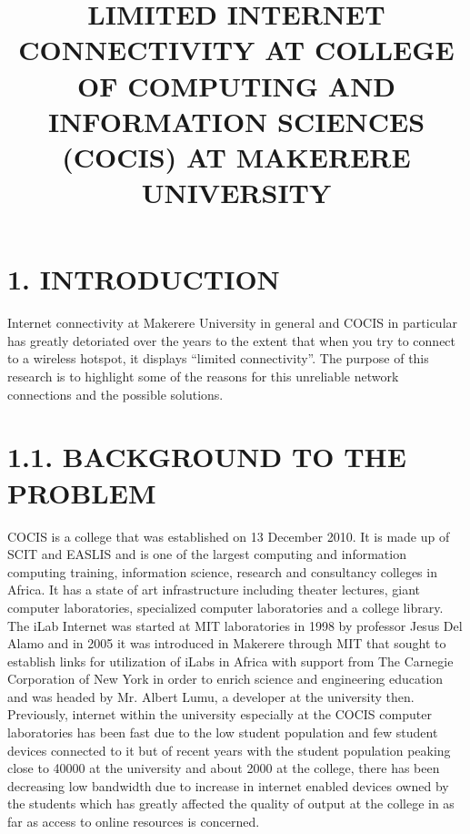\documentclass[11pt]{article}
\begin{document}
\title{LIMITED INTERNET CONNECTIVITY AT COLLEGE OF COMPUTING AND INFORMATION SCIENCES (COCIS) AT MAKERERE UNIVERSITY} 
\maketitle
\section{1.	INTRODUCTION}
        Internet connectivity at Makerere University in general and COCIS in particular has greatly detoriated over the years to the extent that when you try to connect to a wireless hotspot, it displays “limited connectivity”.
The purpose of this research is to highlight some of the reasons for this unreliable network connections and the possible solutions.
                                                                                                                                                                                                                                       
\section{1.1.	BACKGROUND TO THE PROBLEM}
                  COCIS is a college that was established on 13 December 2010. It is made up of SCIT and EASLIS and is one of the largest computing and information computing training, information science, research and consultancy colleges in Africa. It has a state of art infrastructure including theater lectures, giant computer laboratories, specialized computer laboratories and a college library.
The iLab Internet was started at MIT laboratories in 1998 by professor Jesus Del Alamo and in 2005 it was introduced in Makerere through MIT that sought to establish links for utilization of iLabs in Africa with support from The Carnegie Corporation of New York in order to enrich science and engineering education and was headed by Mr. Albert Lumu, a developer at the university then.
Previously, internet within the university especially at the COCIS computer laboratories has been fast due to the low student population and few student devices connected to it but of recent years with the student population peaking close to 40000 at the university and about 2000 at the college, there has been decreasing low bandwidth due to increase in internet enabled devices owned by the students which has greatly affected the quality of output at the college in as far as access to online resources is concerned.
\end{document}
